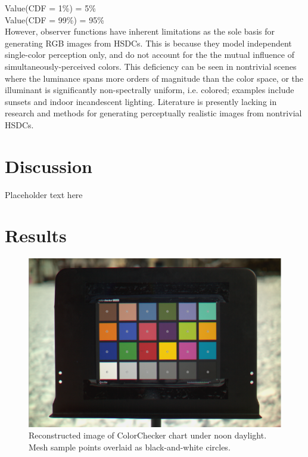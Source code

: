 \documentclass[twocolumn,10pt]{asme2ej}
\begin{document}
Value(CDF = 1\%) = 5\%\\
Value(CDF = 99\%) = 95\%\\

However, observer functions have inherent limitations as the sole basis for generating RGB images from HSDCs. This is because they model independent single-color perception only, and do not account for the the mutual influence of simultaneously-perceived colors. This deficiency can be seen in nontrivial scenes where the luminance spans more orders of magnitude than the color space, or the illuminant is significantly non-spectrally uniform, i.e. colored; examples include sunsets and indoor incandescent lighting. Literature is presently lacking in research and methods for generating perceptually realistic images from nontrivial HSDCs.

\section{Discussion}

Placeholder text here

\clearpage

\onecolumn

\section{Results}

\begin{figure}[H]
\begin{centering}
  \includegraphics[height=0.45\linewidth]{colorchecker_mesh.png}
  \caption{Reconstructed image of ColorChecker chart under noon daylight. Mesh sample points overlaid as black-and-white circles.}
  \label{colorchecker_mesh}
  \end{centering}
\end{figure}
\end{document}

